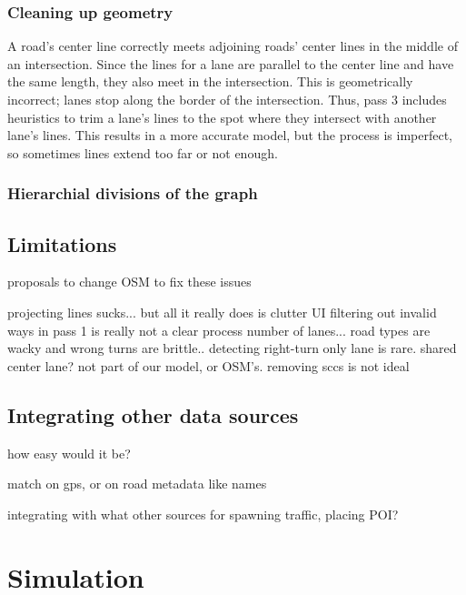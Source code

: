 \documentclass[12pt]{article}
\begin{document}
\subsubsection{Cleaning up geometry}

A road's center line correctly meets adjoining roads' center lines in the middle
of an intersection. Since the lines for a lane are parallel to the center line
and have the same length, they also meet in the intersection. This is
geometrically incorrect; lanes stop along the border of the intersection. Thus,
pass 3 includes heuristics to trim a lane's lines to the spot where they
intersect with another lane's lines. This results in a more accurate model, but
the process is imperfect, so sometimes lines extend too far or not enough.

\subsubsection{Hierarchial divisions of the graph}


\subsection{Limitations}

proposals to change OSM to fix these issues

projecting lines sucks... but all it really does is clutter UI
filtering out invalid ways in pass 1 is really not a clear process
number of lanes... road types are wacky and wrong
turns are brittle.. detecting right-turn only lane is rare. shared center lane?
  not part of our model, or OSM's.
removing sccs is not ideal

\subsection{Integrating other data sources}

how easy would it be?

match on gps, or on road metadata like names

integrating with what other sources for spawning traffic, placing POI?


\section{Simulation}
\end{document}
